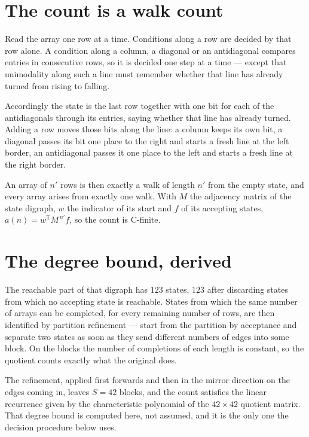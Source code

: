 \documentclass[11pt]{article}
\theoremstyle{definition}
\begin{document}
\section{The count is a walk count}

Read the array one row at a time. Conditions along a row are decided by that row alone. A condition along a column, a diagonal or an antidiagonal compares entries in consecutive rows, so it is decided one step at a time --- except that unimodality along such a line must remember whether that line has already turned from rising to falling.

Accordingly the state is the last row together with one bit for each of the antidiagonals through its entries, saying whether that line has already turned. Adding a row moves those bits along the line: a column keeps its own bit, a diagonal passes its bit one place to the right and starts a fresh line at the left border, an antidiagonal passes it one place to the left and starts a fresh line at the right border.

An array of $n'$ rows is then exactly a walk of length $n'$ from the empty state, and every array arises from exactly one walk. With $M$ the adjacency matrix of the state digraph, $w$ the indicator of its start and $f$ of its accepting states, $a(n) = w^{\mathsf T}M^{\,n'}f$, so the count is C-finite.

\section{The degree bound, derived}

The reachable part of that digraph has $123$ states, $123$ after discarding states from which no accepting state is reachable. States from which the same number of arrays can be completed, for every remaining number of rows, are then identified by partition refinement --- start from the partition by acceptance and separate two states as soon as they send different numbers of edges into some block. On the blocks the number of completions of each length is constant, so the quotient counts exactly what the original does.

The refinement, applied first forwards and then in the mirror direction on the edges coming in, leaves $S = 42$ blocks, and the count satisfies the linear recurrence given by the characteristic polynomial of the $42 \times 42$ quotient matrix. That degree bound is computed here, not assumed, and it is the only one the decision procedure below uses.
\end{document}
